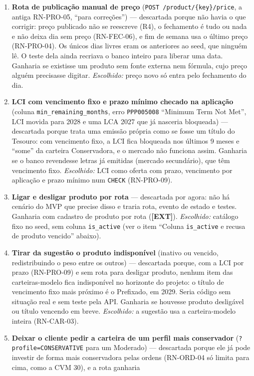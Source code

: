 \documentclass[11pt,a4paper]{article}
\newcommand{\ext}{\textbf{[EXT]}}          %
\newcommand{\tb}[1]{\texttt{#1}}           %
\begin{document}
\begin{enumerate}
  \item \textbf{Rota de publicação manual de preço} (\tb{POST /product/\{key\}/price}, a antiga
  RN-PRO-05, ``para correções'') --- descartada porque não havia o que corrigir: preço publicado não
  se reescreve (R4), o fechamento é tudo ou nada e não deixa dia sem preço (RN-FEC-06), e fim de
  semana usa o último preço (RN-PRO-04). Os únicos dias livres eram os anteriores ao seed, que
  ninguém lê. O teste dela ainda recriava o banco inteiro para liberar uma data. Ganharia se
  existisse um produto sem fonte externa nem fórmula, cujo preço alguém precisasse digitar.
  \emph{Escolhido:} preço novo só entra pelo fechamento do dia.
  \item \textbf{LCI com vencimento fixo e prazo mínimo checado na aplicação} (coluna
  \tb{min_remaining_months}, erro \tb{PPP005008} ``Minimum Term Not Met'', LCI movida para 2028 e
  uma LCA 2027 que já nasceria bloqueada) --- descartada porque trata uma emissão própria como se
  fosse um título do Tesouro: com vencimento fixo, a LCI fica bloqueada nos últimos 9 meses e
  ``some'' da carteira Conservadora, e o mercado não funciona assim. Ganharia se o banco
  revendesse letras já emitidas (mercado secundário), que têm vencimento fixo. \emph{Escolhido:}
  LCI como oferta com prazo, vencimento por aplicação e prazo mínimo num \tb{CHECK} (RN-PRO-09).
  \item \textbf{Ligar e desligar produto por rota} --- descartada por agora: não há cenário do
  MVP que precise disso e traria rota, evento de estado e testes. Ganharia com cadastro de produto
  por rota (\ext). \emph{Escolhido:} catálogo fixo no seed, sem coluna \tb{is_active} (ver o item
  ``Coluna \tb{is_active} e recusa de produto vencido'' abaixo).
  \item \textbf{Tirar da sugestão o produto indisponível} (inativo ou vencido, redistribuindo o
  peso entre os outros) --- descartada porque, com a LCI por prazo (RN-PRO-09) e sem rota para
  desligar produto, nenhum item das carteiras-modelo fica indisponível no horizonte do projeto: o
  título de vencimento fixo mais próximo é o Prefixado, em 2029. Seria código sem situação real e
  sem teste pela API. Ganharia se houvesse produto desligável ou título vencendo em breve.
  \emph{Escolhido:} a sugestão usa a carteira-modelo inteira (RN-CAR-03).
  \item \textbf{Deixar o cliente pedir a carteira de um perfil mais conservador}
  (\tb{?profile=CONSERVATIVE} para um Moderado) --- descartada porque ele já pode investir de forma
  mais conservadora pelas ordens (RN-ORD-04 só limita para cima, como a CVM 30), e a rota ganharia

\end{enumerate}
\end{document}
